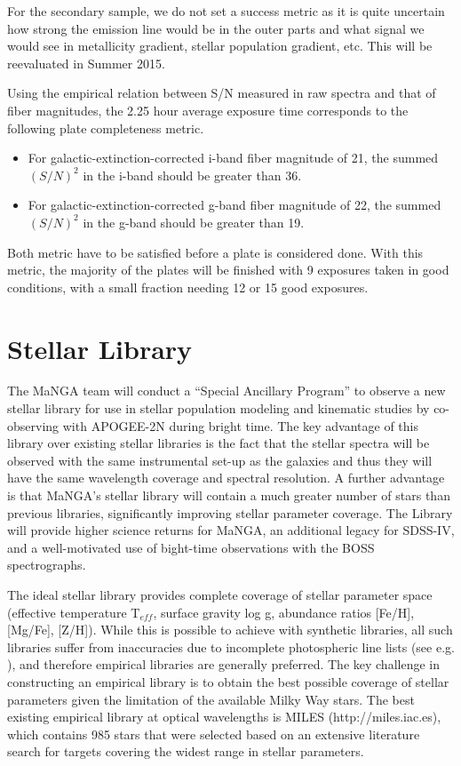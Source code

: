 \documentclass[preprint,11pt]{aastex}
\begin{document}
For the secondary sample, we do not set a success metric as it is quite uncertain how strong the emission line would be in the
outer parts and what signal we would see in metallicity gradient, stellar population gradient, etc. This will be reevaluated in Summer 2015.  

Using the empirical relation between S/N measured in raw spectra and that of fiber magnitudes, the 2.25 hour average exposure time corresponds to the following plate completeness metric. 

\begin{itemize}
\item For galactic-extinction-corrected i-band fiber magnitude of 21, the summed $(S/N)^2$ in the i-band should be greater than 36.
 \item For galactic-extinction-corrected g-band fiber magnitude of 22, the summed $(S/N)^2$ in the g-band should be greater than 19.
\end{itemize}

Both metric have to be satisfied before a plate is considered done. With this metric, the majority of the plates will be finished with 9 exposures taken in good conditions, with a small fraction needing 12 or 15 good exposures. 

\section{Stellar Library} \label{sec:stellar_library}

The MaNGA team will conduct a ``Special Ancillary Program'' to observe a new stellar library for use in stellar population modeling and kinematic studies by co-observing with
APOGEE-2N during bright time.  The key advantage of this library over existing stellar libraries is the fact that the stellar
spectra will be observed with the same instrumental set-up as the galaxies and thus they will have the same wavelength coverage
and spectral resolution. A further advantage is that MaNGA's stellar library will contain a much greater number of stars than
previous libraries, significantly improving stellar parameter coverage.  The Library will provide higher science returns for
MaNGA, an additional legacy for SDSS-IV, and a well-motivated use of bight-time observations with the BOSS spectrographs.

The ideal stellar library provides complete coverage of stellar parameter space (effective temperature T$_{eff}$, surface gravity
log g, abundance ratios [Fe/H], [Mg/Fe], [Z/H]).  While this is possible to achieve with synthetic libraries, all such libraries
suffer from inaccuracies due to incomplete photospheric line lists (see e.g. \citealt{korn2005}), and therefore empirical
libraries are generally preferred.  The key challenge in constructing an empirical library is to obtain the best possible coverage
of stellar parameters given the limitation of the available Milky Way stars.  The best existing empirical library at optical
wavelengths is MILES (http://miles.iac.es), which contains 985 stars that were selected based on an extensive literature search
for targets covering the widest range in stellar parameters.  
\end{document}
